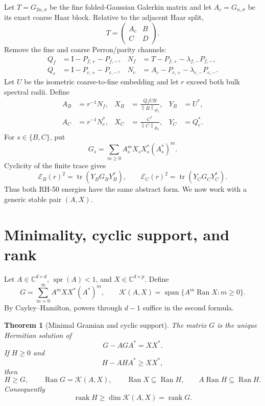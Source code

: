 \documentclass[11pt]{article}
\newtheorem{theorem}{Theorem}[section]
\theoremstyle{definition}
\theoremstyle{remark}
\newcommand{\C}{\mathbb C}
\newcommand{\Id}{\mathrm I}
\newcommand{\cE}{\mathcal E}
\newcommand{\cK}{\mathcal K}
\newcommand{\HS}{\mathfrak S_2}
\newcommand{\tr}{\operatorname{tr}}
\newcommand{\spr}{\operatorname{spr}}
\newcommand{\Ran}{\operatorname{Ran}}
\newcommand{\rank}{\operatorname{rank}}
\newcommand{\norm}[1]{\left\lVert #1\right\rVert}
\begin{document}
Let \(T=G_{2n,\sigma}\) be the fine folded-Gaussian Galerkin matrix and let
\(A_c=G_{n,\sigma}\) be its exact coarse Haar block.  Relative to the
adjacent Haar split,
\[
 T=\begin{pmatrix}A_c&B\\C&D\end{pmatrix}.
\]
Remove the fine and coarse Perron/parity channels:
\begin{align*}
 Q_f&=\Id-P_{f,+}-P_{f,-},
 &N_f&=T-P_{f,+}-\lambda_{f,-}P_{f,-},\\
 Q_c&=\Id-P_{c,+}-P_{c,-},
 &N_c&=A_c-P_{c,+}-\lambda_{c,-}P_{c,-}.
\end{align*}
Let \(U\) be the isometric coarse-to-fine embedding and let \(r\) exceed
both bulk spectral radii.  Define
\begin{align}
 A_B&=r^{-1}N_f,
 &X_B&=\frac{Q_fUB}{\norm B_{\HS}},
 &Y_B&=U^*, \label{eq:left-pair}\\
 A_C&=r^{-1}N_c^*,
 &X_C&=\frac{C^*}{\norm C_{\HS}},
 &Y_C&=Q_c^*. \label{eq:right-pair}
\end{align}
For \(s\in\{B,C\}\), put
\[
 G_s=\sum_{m\ge0}A_s^mX_sX_s^*(A_s^*)^m.
\]
Cyclicity of the finite trace gives
\begin{equation}
 \cE_B(r)^2=\tr(Y_BG_BY_B^*),
 \qquad
 \cE_C(r)^2=\tr(Y_CG_CY_C^*).
 \label{eq:energy-traces}
\end{equation}
Thus both RH-50 energies have the same abstract form.  We now work with a
generic stable pair \((A,X)\).

\section{Minimality, cyclic support, and rank}

Let \(A\in\C^{d\times d}\), \(\spr(A)<1\), and
\(X\in\C^{d\times p}\).  Define
\begin{equation}
 G=\sum_{m=0}^{\infty}A^mXX^*(A^*)^m,
 \qquad
 \cK(A,X)=\operatorname{span}\{A^m\Ran X:m\ge0\}.
 \label{eq:G-K}
\end{equation}
By Cayley--Hamilton, powers through \(d-1\) suffice in the second formula.

\begin{theorem}[Minimal Gramian and cyclic support]
\label{thm:minimal}
The matrix \(G\) is the unique Hermitian solution of
\[
 G-AGA^*=XX^*.
\]
If \(H\ge0\) and
\begin{equation}
 H-AHA^*\ge XX^*,
 \label{eq:one-step}
\end{equation}
then
\begin{equation}
 H\ge G,
 \qquad
 \Ran G=\cK(A,X),
 \qquad
 \Ran X\subseteq\Ran H,
 \qquad
 A\Ran H\subseteq\Ran H.
 \label{eq:minimal-range}
\end{equation}
Consequently
\begin{equation}
 \boxed{\rank H\ge\dim\cK(A,X)=\rank G.}
 \label{eq:rank-lower}
\end{equation}
\end{theorem}
\end{document}
